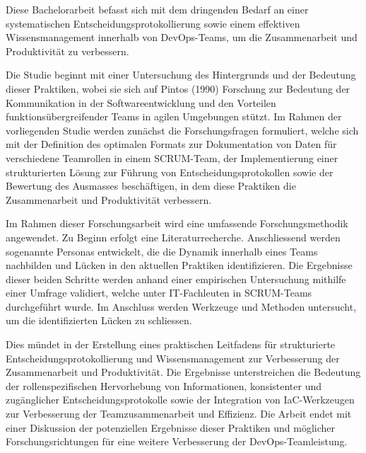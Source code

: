 \begin{extraAbstract}
\addchaptertocentry{\extraabstractname} %
Diese Bachelorarbeit befasst sich mit dem dringenden Bedarf an einer systematischen Entscheidungsprotokollierung sowie einem effektiven Wissensmanagement innerhalb von \ac{DevOps}-Teams, um die Zusammenarbeit und Produktivität zu verbessern.

Die Studie beginnt mit einer Untersuchung des Hintergrunds und der Bedeutung dieser Praktiken, wobei sie sich auf Pintos (1990) Forschung zur Bedeutung der Kommunikation in der Softwareentwicklung und den Vorteilen funktionsübergreifender Teams in agilen Umgebungen stützt. Im Rahmen der vorliegenden Studie werden zunächst die Forschungsfragen formuliert, welche sich mit der Definition des optimalen Formats zur Dokumentation von Daten für verschiedene Teamrollen in einem \ac{SCRUM}-Team, der Implementierung einer strukturierten Lösung zur Führung von Entscheidungsprotokollen sowie der Bewertung des Ausmasses beschäftigen, in dem diese Praktiken die Zusammenarbeit und Produktivität verbessern.

Im Rahmen dieser Forschungsarbeit wird eine umfassende Forschungsmethodik angewendet. Zu Beginn erfolgt eine Literaturrecherche. Anschliessend werden sogenannte Personas entwickelt, die die Dynamik innerhalb eines Teams nachbilden und Lücken in den aktuellen Praktiken identifizieren. Die Ergebnisse dieser beiden Schritte werden anhand einer empirischen Untersuchung mithilfe einer Umfrage validiert, welche unter \ac{IT}-Fachleuten in \ac{SCRUM}-Teams durchgeführt wurde. Im Anschluss werden Werkzeuge und Methoden untersucht, um die identifizierten Lücken zu schliessen.

Dies mündet in der Erstellung eines praktischen Leitfadens für strukturierte Entscheidungsprotokollierung und Wissensmanagement zur Verbesserung der Zusammenarbeit und Produktivität. Die Ergebnisse unterstreichen die Bedeutung der rollenspezifischen Hervorhebung von Informationen, konsistenter und zugänglicher Entscheidungsprotokolle sowie der Integration von \ac{IaC}-Werkzeugen zur Verbesserung der Teamzusammenarbeit und Effizienz. Die Arbeit endet mit einer Diskussion der potenziellen Ergebnisse dieser Praktiken und möglicher Forschungsrichtungen für eine weitere Verbesserung der \ac{DevOps}-Teamleistung.
\end{extraAbstract}
